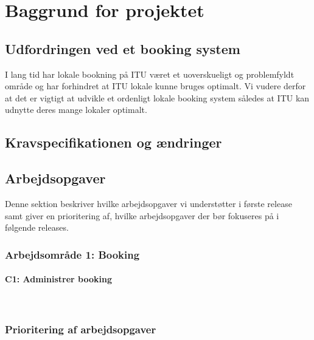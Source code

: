 \chapter{Baggrund for projektet}
\section{Udfordringen ved et booking system}
I lang tid har lokale bookning på ITU været et uoverskueligt og problemfyldt område og har forhindret at ITU lokale kunne bruges optimalt. Vi vudere derfor at det er vigtigt at udvikle et ordenligt lokale booking system således at ITU kan udnytte deres mange lokaler optimalt.
\section{Kravspecifikationen og ændringer}
\section{Arbejdsopgaver}
Denne sektion beskriver hvilke arbejdsopgaver vi understøtter i første release samt giver en prioritering af, hvilke arbejdsopgaver der bør fokuseres på i følgende releases.
\subsection{Arbejdsområde 1: Booking}
\subsubsection{C1: Administrer booking}
\
\subsection{Prioritering af arbejdsopgaver}
